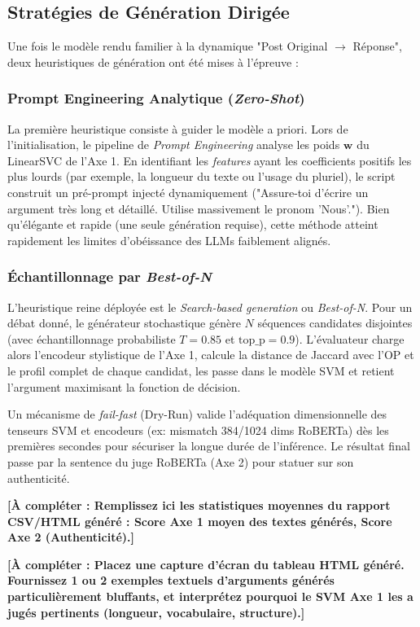 \documentclass[11pt,a4paper]{article}
\begin{document}
\subsection{Stratégies de Génération Dirigée}
Une fois le modèle rendu familier à la dynamique "Post Original $\rightarrow$ Réponse", deux heuristiques de génération ont été mises à l'épreuve :

\subsubsection{Prompt Engineering Analytique (\textit{Zero-Shot})}
La première heuristique consiste à guider le modèle a priori. Lors de l'initialisation, le pipeline de \textit{Prompt Engineering} analyse les poids $\mathbf{w}$ du LinearSVC de l'Axe 1. En identifiant les \textit{features} ayant les coefficients positifs les plus lourds (par exemple, la longueur du texte ou l'usage du pluriel), le script construit un pré-prompt injecté dynamiquement ("Assure-toi d'écrire un argument très long et détaillé. Utilise massivement le pronom 'Nous'."). Bien qu'élégante et rapide (une seule génération requise), cette méthode atteint rapidement les limites d'obéissance des LLMs faiblement alignés.

\subsubsection{Échantillonnage par \textit{Best-of-N}}
L'heuristique reine déployée est le \textit{Search-based generation} ou \textit{Best-of-N}. Pour un débat donné, le générateur stochastique génère $N$ séquences candidates disjointes (avec échantillonnage probabiliste $T=0.85$ et $\text{top\_p}=0.9$). 
L'évaluateur charge alors l'encodeur stylistique de l'Axe 1, calcule la distance de Jaccard avec l'OP et le profil complet de chaque candidat, les passe dans le modèle SVM et retient l'argument maximisant la fonction de décision. 

Un mécanisme de \textit{fail-fast} (Dry-Run) valide l'adéquation dimensionnelle des tenseurs SVM et encodeurs (ex: mismatch 384/1024 dims RoBERTa) dès les premières secondes pour sécuriser la longue durée de l'inférence. Le résultat final passe par la sentence du juge RoBERTa (Axe 2) pour statuer sur son authenticité.

\vspace{0.5cm}
\begin{tcolorbox}[colback=blue!5!white,colframe=blue!75!black,title=Résultats Expérimentaux Axe 3]
\textbf{[À compléter : Remplissez ici les statistiques moyennes du rapport CSV/HTML généré : Score Axe 1 moyen des textes générés, Score Axe 2 (Authenticité).]}

\textbf{[À compléter : Placez une capture d'écran du tableau HTML généré. Fournissez 1 ou 2 exemples textuels d'arguments générés particulièrement bluffants, et interprétez pourquoi le SVM Axe 1 les a jugés pertinents (longueur, vocabulaire, structure).]}
\end{tcolorbox}
\end{document}
